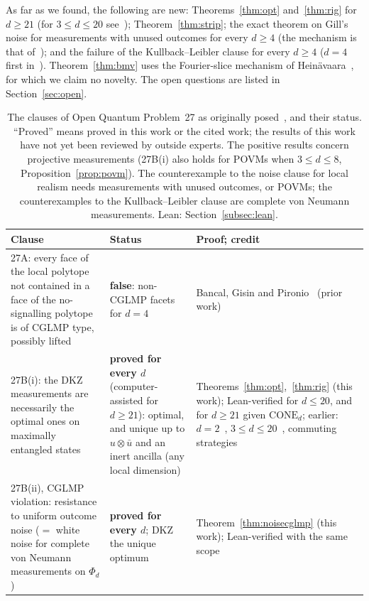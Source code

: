 \documentclass[11pt]{article}
\theoremstyle{remark}
\numberwithin{equation}{section}
\newcommand{\CONE}{\mathrm{CONE}}
\begin{document}
As far as we found, the following are new: Theorems~\ref{thm:opt} and~\ref{thm:rig} for $d\ge21$ (for $3\le d\le20$
see~\cite{repoCGLMP}); Theorem~\ref{thm:strip}; the exact theorem on Gill's noise for measurements with unused outcomes
for every $d\ge4$ (the mechanism is that of~\cite{ADGL}); and the failure of the Kullback--Leibler clause for every
$d\ge4$ ($d=4$ first in~\cite{Zhang}). Theorem~\ref{thm:bmv} uses the Fourier-slice mechanism of
Hein\"avaara~\cite{He}, for which we claim no novelty. The open questions are listed in Section~\ref{sec:open}.

\begin{table}[t]
\centering\small
\caption{The clauses of Open Quantum Problem~27 as originally posed~\cite{OQP}, and their status. ``Proved'' means proved
in this work or the cited work; the results of this work have not yet been reviewed by outside experts. The positive
results concern projective measurements (27B(i) also holds for POVMs when $3\le d\le8$, Proposition~\ref{prop:povm}).
The counterexample to the noise clause for local realism needs measurements with unused outcomes, or POVMs; the
counterexamples to the Kullback--Leibler clause are complete von Neumann measurements. Lean:
Section~\ref{subsec:lean}.}
\label{tab:status}
\begin{tabular}{@{}>{\raggedright\arraybackslash}p{}>{\raggedright\arraybackslash}p{}>{\raggedright\arraybackslash}p{}@{}}
\toprule
Clause & Status & Proof; credit\\
\midrule
27A: every face of the local polytope not contained in a face of the no-signalling polytope is of CGLMP type,
possibly lifted & \textbf{false}: non-CGLMP facets for $d=4$ & Bancal, Gisin and Pironio~\cite{BGP} (prior work)\\
27B(i): the DKZ measurements are necessarily the optimal ones on maximally entangled states & \textbf{proved for every
$d$} (computer-assisted for $d\ge21$): optimal, and unique up to $u\otimes\bar u$ and an inert ancilla (any local
dimension) &
Theorems~\ref{thm:opt},~\ref{thm:rig} (this work); Lean-verified for $d\le20$, and for $d\ge21$ given $\CONE_d$;
earlier: $d=2$~\cite{Tsirelson}, $3\le d\le20$~\cite{repoCGLMP}, commuting strategies~\cite{MSclassical}\\
27B(ii), CGLMP violation: resistance to uniform outcome noise ($=$ white noise for complete von Neumann measurements
on $\Phi_d$) & \textbf{proved for every $d$}; DKZ the unique optimum & Theorem~\ref{thm:noisecglmp} (this work); Lean-verified
with the same scope\\

\end{tabular}
\end{table}
\end{document}
